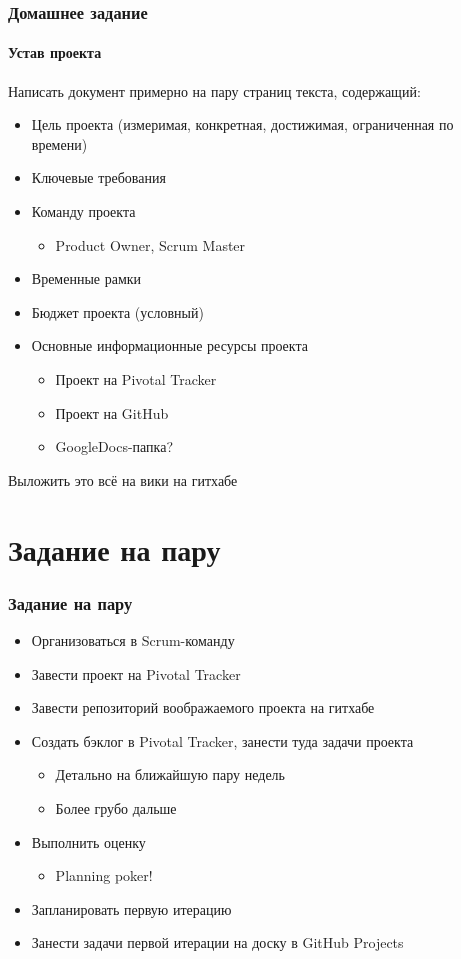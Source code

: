 \documentclass[xetex,mathserif,serif]{beamer}
\begin{document}
	\begin{frame}
		\frametitle{Домашнее задание}
		\framesubtitle{Устав проекта}
		Написать документ примерно на пару страниц текста, содержащий:
		\begin{itemize}
			\item Цель проекта (измеримая, конкретная, достижимая, ограниченная по времени)
			\item Ключевые требования
			\item Команду проекта
			\begin{itemize}
				\item Product Owner, Scrum Master
			\end{itemize}
			\item Временные рамки
			\item Бюджет проекта (условный)
			\item Основные информационные ресурсы проекта
			\begin{itemize}
				\item Проект на Pivotal Tracker
				\item Проект на GitHub
				\item GoogleDocs-папка?
			\end{itemize}
		\end{itemize}
		Выложить это всё на вики на гитхабе
	\end{frame}

	\section{Задание на пару}

	\begin{frame}
		\frametitle{Задание на пару}
		\begin{itemize}
			\item Организоваться в Scrum-команду
			\item Завести проект на Pivotal Tracker
			\item Завести репозиторий воображаемого проекта на гитхабе
			\item Создать бэклог в Pivotal Tracker, занести туда задачи проекта
			\begin{itemize}
				\item Детально на ближайшую пару недель
				\item Более грубо дальше
			\end{itemize}
			\item Выполнить оценку
			\begin{itemize}
				\item Planning poker!
			\end{itemize}
			\item Запланировать первую итерацию
			\item Занести задачи первой итерации на доску в GitHub Projects
		\end{itemize}
	\end{frame}
\end{document}
